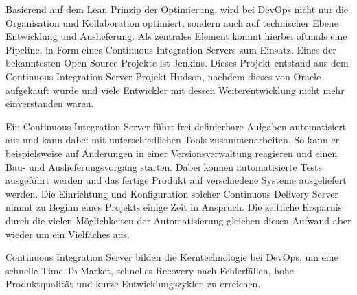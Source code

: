 Basierend auf dem Lean Prinzip der Optimierung, wird bei DevOps nicht nur die Organisation und Kollaboration optimiert, sondern auch auf technischer Ebene Entwicklung und Auslieferung. 
Als zentrales Element kommt hierbei oftmals eine Pipeline, in Form eines Continuous Integration Servers zum Einsatz. 
Eines der bekanntesten Open Source Projekte ist Jenkins. 
Dieses Projekt entstand aus dem Continuous Integration Server Projekt Hudson, nachdem dieses von Oracle aufgekauft wurde und viele Entwickler mit dessen Weiterentwicklung nicht mehr einverstanden waren. \parencite[Vgl.][S. 4]{smart:2011}

Ein Continuous Integration Server führt frei definierbare Aufgaben automatisiert aus und kann dabei mit unterschiedlichen Tools zusammenarbeiten. 
So kann er beispielsweise auf Änderungen in einer Versionsverwaltung reagieren und einen Bau- und Auslieferungsvorgang starten. 
Dabei können automatisierte Tests ausgeführt werden und das fertige Produkt auf verschiedene Systeme ausgeliefert werden. 
Die Einrichtung und Konfiguration solcher Continuous Delivery Server nimmt zu Beginn eines Projekts einige Zeit in Anspruch. 
Die zeitliche Ersparnis durch die vielen Möglichkeiten der Automatisierung gleichen diesen Aufwand aber wieder um ein Vielfaches aus. 
\parencite[Vgl.][S. 65 ff.]{smart:2011}

Continuous Integration Server bilden die Kerntechnologie bei DevOps, um eine schnelle Time To Market, schnelles Recovery nach Fehlerfällen, hohe Produktqualität und kurze Entwicklungszyklen zu erreichen.



